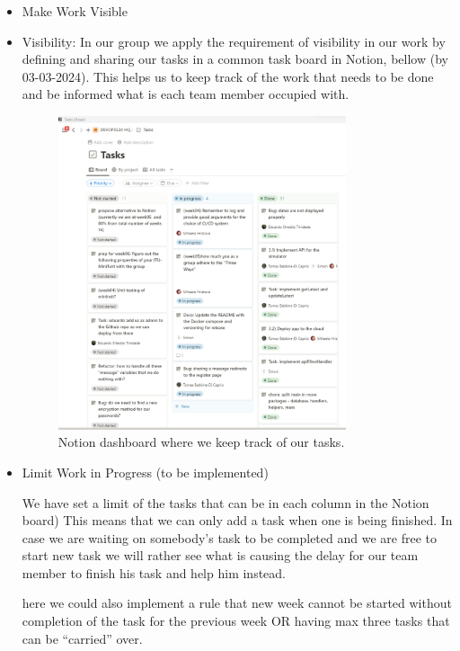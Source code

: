 \documentclass{article}
\begin{document}
\begin{itemize}

\item Make Work Visible
  \item Visibility:  In our group we apply the requirement of visibility in our work by defining and sharing our tasks in a common task board in Notion, bellow (by 03-03-2024). This helps us to keep track of the work that needs to be done and be informed what is each team member occupied with.

\begin{figure}[ht]
    \centering
    \includegraphics[width=0.8\textwidth]{./images/notion-dashboard-visibility-three-ways.png}
    \caption{Notion dashboard where we keep track of our tasks.}
    \label{fig:notion-dashboard}
\end{figure}
    
\item Limit Work in Progress
(to be implemented)

We have set a limit of the tasks  that can  be in each column in the Notion board) This means that we can only add a task when one is being finished. In case we are waiting on somebody’s task to be completed and we are free to start new task we will rather see what is causing the delay for our team member to finish his task and help him instead. 

here we could also implement a rule that new week cannot be started without completion of the task for the previous week OR having max three tasks that can be “carried” over.


\end{itemize}
\end{document}
